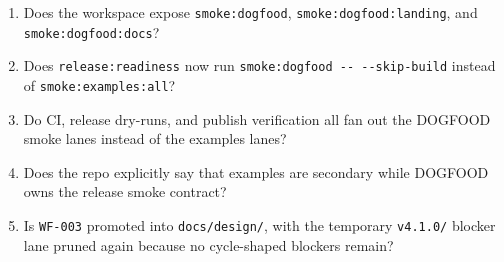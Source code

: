 \begin{enumerate}
\def\labelenumi{\arabic{enumi}.}
\tightlist
\item
  Does the workspace expose \texttt{s\allowbreak{}m\allowbreak{}o\allowbreak{}k\allowbreak{}e\allowbreak{}:\allowbreak{}d\allowbreak{}o\allowbreak{}g\allowbreak{}f\allowbreak{}o\allowbreak{}o\allowbreak{}d}, \texttt{s\allowbreak{}m\allowbreak{}o\allowbreak{}k\allowbreak{}e\allowbreak{}:\allowbreak{}d\allowbreak{}o\allowbreak{}g\allowbreak{}f\allowbreak{}o\allowbreak{}o\allowbreak{}d\allowbreak{}:\allowbreak{}l\allowbreak{}a\allowbreak{}n\allowbreak{}d\allowbreak{}i\allowbreak{}n\allowbreak{}g}, and \texttt{s\allowbreak{}m\allowbreak{}o\allowbreak{}k\allowbreak{}e\allowbreak{}:\allowbreak{}d\allowbreak{}o\allowbreak{}g\allowbreak{}f\allowbreak{}o\allowbreak{}o\allowbreak{}d\allowbreak{}:\allowbreak{}d\allowbreak{}o\allowbreak{}c\allowbreak{}s}?
\item
  Does \texttt{r\allowbreak{}e\allowbreak{}l\allowbreak{}e\allowbreak{}a\allowbreak{}s\allowbreak{}e\allowbreak{}:\allowbreak{}r\allowbreak{}e\allowbreak{}a\allowbreak{}d\allowbreak{}i\allowbreak{}n\allowbreak{}e\allowbreak{}s\allowbreak{}s} now run \texttt{s\allowbreak{}m\allowbreak{}o\allowbreak{}k\allowbreak{}e\allowbreak{}:\allowbreak{}d\allowbreak{}o\allowbreak{}g\allowbreak{}f\allowbreak{}o\allowbreak{}o\allowbreak{}d\allowbreak{} \allowbreak{}-\allowbreak{}-\allowbreak{} \allowbreak{}-\allowbreak{}-\allowbreak{}s\allowbreak{}k\allowbreak{}i\allowbreak{}p\allowbreak{}-\allowbreak{}b\allowbreak{}u\allowbreak{}i\allowbreak{}l\allowbreak{}d} instead of \texttt{s\allowbreak{}m\allowbreak{}o\allowbreak{}k\allowbreak{}e\allowbreak{}:\allowbreak{}e\allowbreak{}x\allowbreak{}a\allowbreak{}m\allowbreak{}p\allowbreak{}l\allowbreak{}e\allowbreak{}s\allowbreak{}:\allowbreak{}a\allowbreak{}l\allowbreak{}l}?
\item
  Do CI, release dry-runs, and publish verification all fan out the DOGFOOD smoke lanes instead of the examples lanes?
\item
  Does the repo explicitly say that examples are secondary while DOGFOOD owns the release smoke contract?
\item
  Is \texttt{W\allowbreak{}F\allowbreak{}-\allowbreak{}0\allowbreak{}0\allowbreak{}3} promoted into \texttt{d\allowbreak{}o\allowbreak{}c\allowbreak{}s\allowbreak{}/\allowbreak{}d\allowbreak{}e\allowbreak{}s\allowbreak{}i\allowbreak{}g\allowbreak{}n\allowbreak{}/}, with the temporary \texttt{v\allowbreak{}4\allowbreak{}.\allowbreak{}1\allowbreak{}.\allowbreak{}0\allowbreak{}/} blocker lane pruned again because no cycle-shaped blockers remain?
\end{enumerate}

